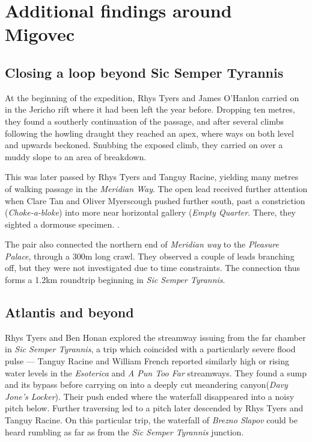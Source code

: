 \section{Additional findings around Migovec}

\subsection{Closing a loop beyond Sic Semper Tyrannis}
At the beginning of the expedition, Rhys Tyers and James O'Hanlon carried on in the Jericho rift where it had been left the year before. Dropping ten metres, they found a southerly continuation of the passage, and after several climbs following the howling draught they reached an apex, where ways on both level and upwards beckoned. Snubbing the exposed climb, they carried on over a muddy slope to an area of breakdown. 

This was later passed by Rhys Tyers and Tanguy Racine, yielding many metres of walking passage in the \emph{Meridian Way}. The open lead received further attention when Clare Tan and Oliver Myerscough pushed further south, past a constriction (\emph{Choke-a-bloke}) into more near horizontal gallery (\emph{Empty Quarter}. There, they sighted a dormouse specimen. .

The pair also connected the northern end of \emph{Meridian way} to the \emph{Pleasure Palace}, through a 300m long crawl. They observed a couple of leads branching off, but they were not investigated due to time constraints. The connection thus forms a 1.2km roundtrip beginning in \emph{Sic Semper Tyrannis}.

\subsection{Atlantis and beyond}
Rhys Tyers and Ben Honan explored the streamway issuing from the far chamber in \emph{Sic Semper Tyrannis}, a trip which coincided with a particularly severe flood pulse --- Tanguy Racine and William French reported similarly high or rising water levels in the \emph{Esoterica} and \emph{A Pun Too Far} streamways. They found a sump and its bypass before carrying on into a deeply cut meandering canyon(\emph{Davy Jone's Locker}). Their push ended where the waterfall disappeared into a noisy pitch below. Further traversing led to a pitch later descended by Rhys Tyers and Tanguy Racine. On this particular trip, the waterfall of \emph{Brezno Slapov} could be heard rumbling as far as from the \emph{Sic Semper Tyrannis} junction. 

